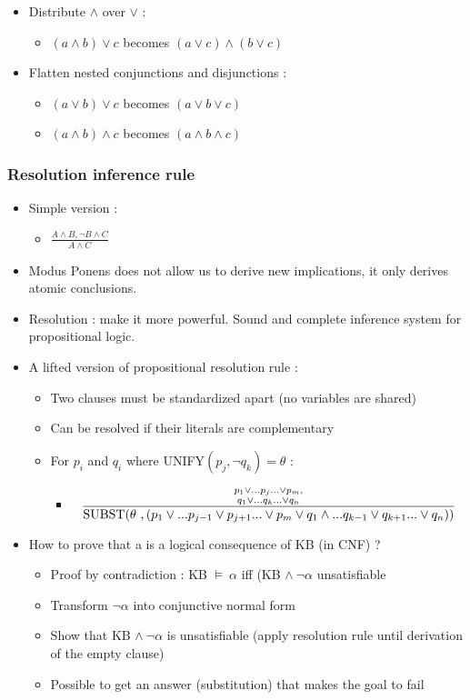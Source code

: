 \begin{itemize}
\item Distribute $\land$ over $\lor$ :
	\begin{itemize}
	\item[] $(a \land b) \lor c$ becomes $(a \lor c) \land (b \lor c)$
	\end{itemize}
\item Flatten nested conjunctions and disjunctions :
	\begin{itemize}
	\item[] $(a \lor b) \lor c$ becomes $(a \lor b \lor c)$
	\item[] $(a \land b) \land c$ becomes $(a \land b \land c)$
	\end{itemize}
\end{itemize}

\subsubsection{Resolution inference rule}

\begin{itemize}
\item Simple version :
	\begin{itemize}
	\item[] $\frac{A \land B, \neg B \land C}{A \land C}$
	\end{itemize}
\item Modus Ponens does not allow us to derive new implications, it only derives atomic conclusions.
\item Resolution : make it more powerful. Sound and complete inference system for propositional logic.
\item A lifted version of propositional resolution rule :
	\begin{itemize}
	\item Two clauses must be standardized apart (no variables are shared)
	\item Can be resolved if their literals are complementary
	\item For $p_i$ and $q_i$ where UNIFY$(p_j, \neg q_k) = \theta$ :
		\begin{itemize}
		\item[] \[\frac{{p_1 \lor ... p_j ... \lor p_m, \atop q_1 \lor ... q_k ... \lor q_n}}{\text{SUBST}(\theta \ ,(p_1 \lor ... p_{j-1} \lor p_{j+1} ... \lor p_m \lor q_1 \land ... q_{k-1} \lor q_{k+1} ... \lor q_n))}\]
		\end{itemize}
	\end{itemize}
\item How to prove that a is a logical consequence of KB (in CNF) ? 
	\begin{itemize}
	\item Proof by contradiction : KB $\models \ \alpha$ iff (KB $\land \ \neg \alpha$ unsatisfiable
	\item Transform $\neg \alpha$ into conjunctive normal form
	\item Show that KB $\land \ \neg \alpha$ is unsatisfiable (apply resolution rule until derivation of the empty clause)
	\item Possible to get an answer (substitution) that makes the goal to fail
	\end{itemize}	
\end{itemize}
